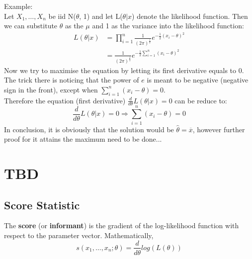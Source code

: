 \documentclass[12pt ]{article}
\begin{document}
\color{blue}
\noindent
Example: \\
\indent
Let $X_{1}, \ldots, X_{n}$ be iid N($\theta$, 1) and let L($\theta|x$) denote the likelihood function. Then we can substitute $\theta$ as the $\mu$ and 1 as the variance into the likelihood function:
\begin{equation*}
\begin{split}
L(\theta|x) &= \prod_{i=1}^{n} \frac{1}{(2\pi)^{\frac{1}{2}}} e^{-\frac{1}{2}(x_{i} - \theta)^2} \\
&= \frac{1}{(2\pi)^{\frac{1}{2}}} e^{-\frac{1}{2} \sum_{i=1}^{n} (x_{i} - \theta)^2}
\end{split}
\end{equation*}
Now we try to maximise the equation by letting its first derivative equals to 0. The trick there is noticing that the power of $e$ is meant to be negative (negative sign in the front), except when $\sum_{i=1}^{n} (x_{i}-\theta) = 0$.\\

Therefore the equation (first derivative) $\frac{d}{d\theta}L(\theta|x) = 0$ can be reduce to:
\begin{equation*}
\frac{d}{d\theta}L(\theta|x) = 0 \Rightarrow \sum_{i=1}^{n} (x_{i}-\theta) = 0
\end{equation*}
In conclusion, it is obviously that the solution would be $\hat{\theta} = \overline{x}$, however further proof for it attains the maximum need to be done...


\color{black}
\section{TBD}
\subsection{Score Statistic}
The \textbf{score} (or \textbf{informant}) is the gradient of the log-likelihood function with respect to the parameter vector. Mathematically, 
\begin{equation}
s(x_{1}, \ldots, x_{n};\theta) = \frac{d}{d\theta} log(L(\theta))
\end{equation} \\
\end{document}
